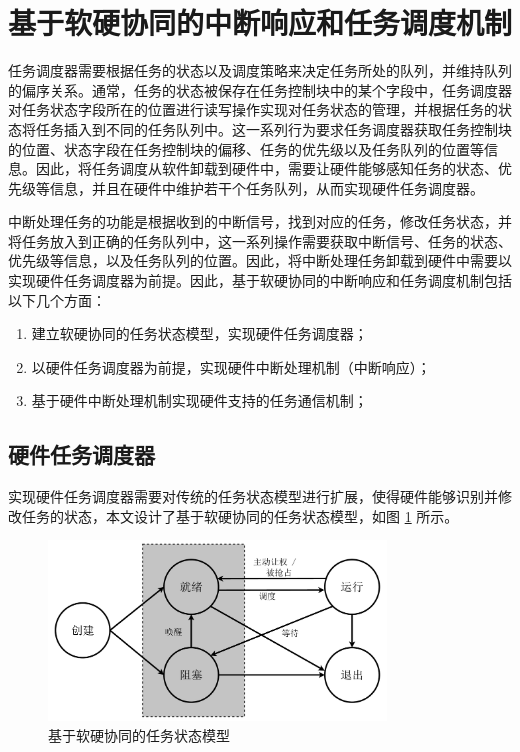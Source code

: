 \section{基于软硬协同的中断响应和任务调度机制}

任务调度器需要根据任务的状态以及调度策略来决定任务所处的队列，并维持队列的偏序关系。通常，任务的状态被保存在任务控制块中的某个字段中，任务调度器对任务状态字段所在的位置进行读写操作实现对任务状态的管理，并根据任务的状态将任务插入到不同的任务队列中。这一系列行为要求任务调度器获取任务控制块的位置、状态字段在任务控制块的偏移、任务的优先级以及任务队列的位置等信息。因此，将任务调度从软件卸载到硬件中，需要让硬件能够感知任务的状态、优先级等信息，并且在硬件中维护若干个任务队列，从而实现硬件任务调度器。

中断处理任务的功能是根据收到的中断信号，找到对应的任务，修改任务状态，并将任务放入到正确的任务队列中，这一系列操作需要获取中断信号、任务的状态、优先级等信息，以及任务队列的位置。因此，将中断处理任务卸载到硬件中需要以实现硬件任务调度器为前提。因此，基于软硬协同的中断响应和任务调度机制包括以下几个方面：

\begin{enumerate}
    \item 建立软硬协同的任务状态模型，实现硬件任务调度器；
    \item 以硬件任务调度器为前提，实现硬件中断处理机制（中断响应）；
    \item 基于硬件中断处理机制实现硬件支持的任务通信机制；
\end{enumerate}

\subsection{硬件任务调度器}

实现硬件任务调度器需要对传统的任务状态模型进行扩展，使得硬件能够识别并修改任务的状态，本文设计了基于软硬协同的任务状态模型，如图 \ref{figure:task_state} 所示。

\begin{figure}[htbp]
    \centering
    \includegraphics[width=0.8\textwidth]{figures/task_state.pdf}
    \caption{基于软硬协同的任务状态模型}
    \label{figure:task_state}
\end{figure}

